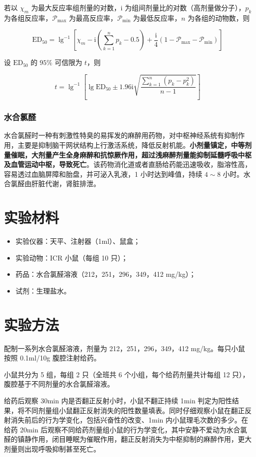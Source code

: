 \documentclass[UTF8]{ctexart}
\begin{document}
若以 $\chi_m$ 为最大反应率组剂量的对数，$\mathrm{i}$ 为组间剂量比的对数（高剂量做分子），$p_k$ 为各组反应率，$\mathcal{P}_{\text{max}}$ 为最高反应率，$\mathcal{P}_{\text{min}}$ 为最低反应率，$n$ 为各组的动物数，则

$$
    \text{ED}_{50}=\lg^{-1}\left[\chi_m-\mathrm{i}\left(\sum_{k=1}^np_k-0.5\right)+\frac{\mathrm{i}}{4}(1-\mathcal{P}_{\text{max}}-\mathcal{P}_{\text{min}})\right]
$$

设 $\text{ED}_{50}$ 的 $95\%$ 可信限为 $t$，则

$$
    t=\lg^{-1}\left[\lg\text{ED}_{50}\pm 1.96\mathrm{i}\sqrt{\frac{\sum_{k=1}^n(p_k-p_k^2)}{n-1}}\right]
$$

\subsubsection{水合氯醛}

水合氯醛时一种有刺激性特臭的易挥发的麻醉用药物，对中枢神经系统有抑制作用，主要是抑制脑干网状结构上行激活系统，降低反射机能。\textbf{小剂量镇定，中等剂量催眠，大剂量产生全身麻醉和抗惊厥作用，超过浅麻醉剂量能抑制延髓呼吸中枢及血管运动中枢，导致死亡}。该药物消化道或者直肠给药能迅速吸收，脂溶性高，容易透过血脑屏障和胎盘，并可泌入乳液，1 小时达到峰值，持续 $4\sim 8$ 小时。水合氯醛由肝脏代谢，肾脏排泄。

\section{实验材料}

\begin{itemize}
    \item 实验仪器：天平、注射器（1ml）、鼠盒；
    \item 实验动物：ICR 小鼠（每组 10 只）；
    \item 药品：水合氯醛溶液（212，251，296，349，412 mg/kg）；
    \item 试剂：生理盐水。
\end{itemize}

\section{实验方法}

配制一系列水合氯醛溶液，剂量为 212，251，296，349，412 mg/kg。每只小鼠按照 0.1ml/10g 腹腔注射给药。

小鼠共分为 5 组，每组 2 只（全班共 6 个小组，每个给药剂量共计每组 12 只），腹腔基于不同剂量的水合氯醛溶液。

给药后观察 30min 内是否翻正反射小时，小鼠不翻正持续 1min 判定为阳性结果，将不同剂量组小鼠翻正反射消失的阳性数量填表。同时仔细观察小鼠在翻正反射消失前后的行为学变化，包括兴奋性的改变、1min 内小鼠理毛次数的多少。在给药 20min 后观察不同给药剂量组小鼠的行为学变化，其中安静不爱动为水合氯醛的镇静作用，闭目睡眠为催眠作用，翻正反射消失为中枢抑制的麻醉作用，更大剂量则出现呼吸抑制甚至死亡。
\end{document}
